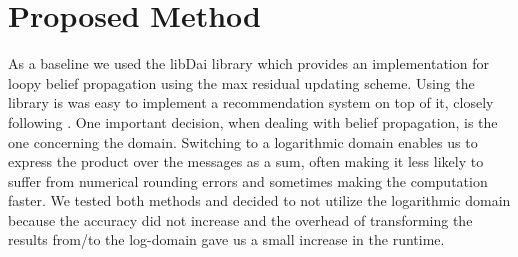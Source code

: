 \section{Proposed Method}\label{sec:method}


As a baseline we used the libDai library \cite{Mooij_libDAI_10} which provides an implementation for loopy belief propagation using the max residual updating scheme. Using the library is was easy to implement a recommendation system on top of it, closely following \cite{Ha:2012:TRT:2396761.2398636}. One important decision, when dealing with belief propagation, is the one concerning the domain. Switching to a logarithmic domain enables us to express the product over the messages as a sum, often making it less likely to suffer from numerical rounding errors and sometimes making the computation faster. We tested both methods and decided to not utilize the logarithmic domain because the accuracy did not increase and the overhead of transforming the results from/to the log-domain gave us a small increase in the runtime. 

